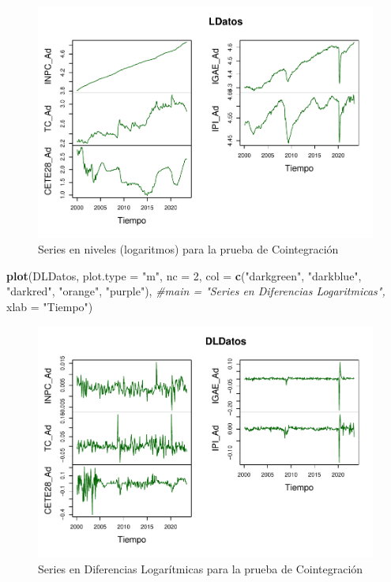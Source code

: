 \documentclass[
]{book}
\newenvironment{Shaded}{\begin{snugshade}}{\end{snugshade}}
\newcommand{\AttributeTok}[1]{\textcolor[rgb]{0.13,0.29,0.53}{#1}}
\newcommand{\CommentTok}[1]{\textcolor[rgb]{0.56,0.35,0.01}{\textit{#1}}}
\newcommand{\DecValTok}[1]{\textcolor[rgb]{0.00,0.00,0.81}{#1}}
\newcommand{\FunctionTok}[1]{\textcolor[rgb]{0.13,0.29,0.53}{\textbf{#1}}}
\newcommand{\NormalTok}[1]{#1}
\newcommand{\StringTok}[1]{\textcolor[rgb]{0.31,0.60,0.02}{#1}}
\begin{document}
\begin{figure}

{\centering \includegraphics{Notas-Series-Tiempo_files/figure-latex/fig81-1} 

}

\caption{Series en niveles (logaritmos) para la prueba de Cointegración}\label{fig:fig81}
\end{figure}

\begin{Shaded}
\begin{Highlighting}[]
\FunctionTok{plot}\NormalTok{(DLDatos, }
     \AttributeTok{plot.type =} \StringTok{"m"}\NormalTok{, }\AttributeTok{nc =} \DecValTok{2}\NormalTok{,}
     \AttributeTok{col =} \FunctionTok{c}\NormalTok{(}\StringTok{"darkgreen"}\NormalTok{, }\StringTok{"darkblue"}\NormalTok{, }\StringTok{"darkred"}\NormalTok{, }\StringTok{"orange"}\NormalTok{, }\StringTok{"purple"}\NormalTok{), }
     \CommentTok{\#main = "Series en Diferencias Logaritmicas", }
     \AttributeTok{xlab =} \StringTok{"Tiempo"}\NormalTok{)}
\end{Highlighting}
\end{Shaded}

\begin{figure}

{\centering \includegraphics{Notas-Series-Tiempo_files/figure-latex/fig82-1} 

}

\caption{Series en Diferencias Logarítmicas para la prueba de Cointegración}\label{fig:fig82}
\end{figure}
\end{document}
